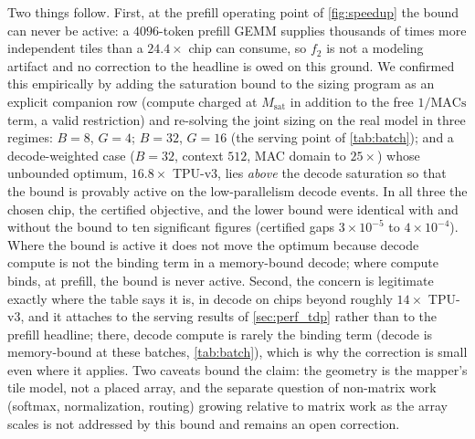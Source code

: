 Two things follow. First, at the prefill operating point of \cref{fig:speedup}
the bound can never be active: a $4096$-token prefill GEMM supplies thousands
of times more independent tiles than a $24.4\times$ chip can consume, so
$f_2$ is not a modeling artifact and no correction to the headline is owed on
this ground. We confirmed this empirically by adding the saturation bound to
the sizing program as an explicit companion row (compute charged at
$M_{\mathrm{sat}}$ in addition to the free $1/\mathrm{MACs}$ term, a valid
restriction) and re-solving the joint sizing on the real model in three regimes:
$B{=}8$, $G{=}4$; $B{=}32$, $G{=}16$ (the serving point of \cref{tab:batch});
and a decode-weighted case ($B{=}32$, context $512$, MAC domain to $25\times$)
whose unbounded optimum, $16.8\times$ TPU-v3, lies \emph{above} the decode
saturation so that the bound is provably active on the low-parallelism decode
events. In all three the chosen chip, the certified objective, and the lower
bound were identical with and without the bound to ten significant figures
(certified gaps $3\times10^{-5}$ to $4\times10^{-4}$). Where the bound is active
it does not move the optimum because decode compute is not the binding term in
a memory-bound decode; where compute binds, at prefill, the bound is never
active. Second, the concern is legitimate exactly where the
table says it is, in decode on chips beyond roughly $14\times$ TPU-v3, and it
attaches to the serving results of \cref{sec:perf_tdp} rather than to the
prefill headline; there, decode compute is rarely the binding term (decode is
memory-bound at these batches, \cref{tab:batch}), which is why the correction is
small even where it applies. Two caveats bound the claim: the geometry is the
mapper's tile model, not a placed array, and the separate question of
non-matrix work (softmax, normalization, routing) growing relative to matrix
work as the array scales is not addressed by this bound and remains an open
correction.

